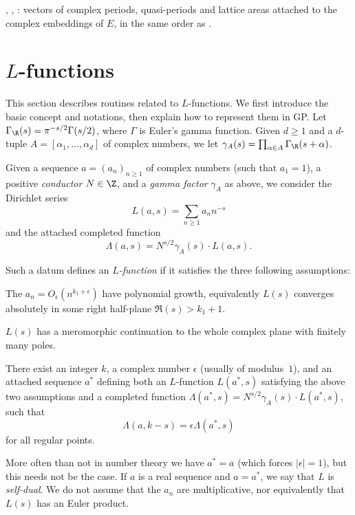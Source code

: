 \item {}, , : vectors of complex periods,
quasi-periods and lattice areas attached to the complex embeddings of $E$,
in the same order as .


\section{$L$-functions}

This section describes routines related to $L$-functions. We first introduce
the basic concept and notations, then explain how to represent them in GP.
Let $\Gamma_\R(s) = \pi^{-s/2}\Gamma(s/2)$, where $\Gamma$ is Euler's gamma
function. Given $d \geq 1$ and a $d$-tuple $A=[\alpha_1,\dots,\alpha_d]$ of
complex numbers, we let $\gamma_A(s) = \prod_{\alpha \in A} \Gamma_\R(s +
\alpha)$.

Given a sequence $a = (a_n)_{n\geq 1}$ of complex numbers (such that $a_1 = 1$),
a positive \emph{conductor} $N \in \Z$, and a \emph{gamma factor}
$\gamma_A$ as above, we consider the Dirichlet series
$$ L(a,s) = \sum_{n\geq 1} a_n n^{-s} $$
and the attached completed function
$$ \Lambda(a,s) = N^{s/2}\gamma_A(s) \cdot L(a,s). $$

Such a datum defines an \emph{$L$-function} if it satisfies the three
following assumptions:

\item [Convergence] The $a_n = O_\epsilon(n^{k_1+\epsilon})$ have polynomial
growth, equivalently $L(s)$ converges absolutely in some right half-plane
$\Re(s) > k_1 + 1$.

\item [Analytic continuation] $L(s)$ has a meromorphic continuation to the
whole complex plane with finitely many poles.

\item [Functional equation] There exist an integer $k$, a complex number
$\epsilon$ (usually of modulus~$1$), and an attached sequence $a^*$
defining both an $L$-function $L(a^*,s)$ satisfying the above two assumptions
and a completed function $\Lambda(a^*,s) = N^{s/2}\gamma_A(s) \cdot
L(a^*,s)$, such that
$$\Lambda(a,k-s) = \epsilon \Lambda(a^*,s)$$
for all regular points.

More often than not in number theory we have $a^* = \overline{a}$ (which
forces $|\epsilon| = 1$), but this needs not be the case. If $a$ is a real
sequence and $a = a^*$, we say that $L$ is \emph{self-dual}. We do not assume
that the $a_n$ are multiplicative, nor equivalently that $L(s)$ has an Euler
product.

